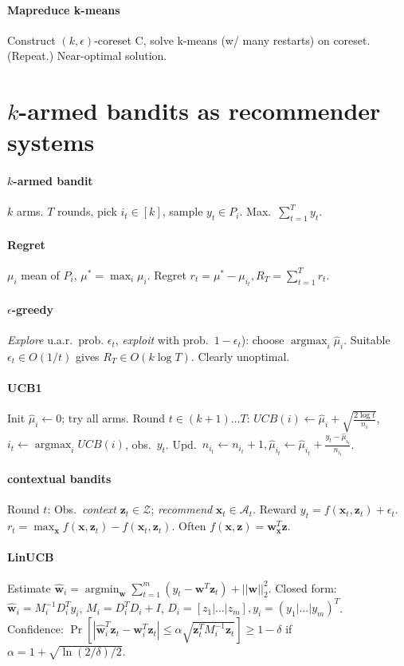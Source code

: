\documentclass[9pt]{scrartcl}
\DeclareMathOperator{\argmin}{argmin}
\DeclareMathOperator{\argmax}{argmax}
\newcommand{\eps}{\epsilon}
\begin{document}
\begin{twocolumn}
\paragraph{Mapreduce k-means} Construct $(k,\eps)$-coreset C, solve k-means (w/ many restarts) on coreset. (Repeat.) Near-optimal solution.

\section{$k$-armed bandits as recommender systems}
\paragraph{$k$-armed bandit}
$k$ arms. $T$ rounds, pick $i_t\in[k]$, sample $y_t \in P_i$. Max.\ $\sum_{t=1}^{T} y_t$.
\paragraph{Regret} $\mu_i$ mean of $P_i$, $\mu^* = \max_i \mu_i$. Regret $r_t = \mu^* - \mu_{i_t}, R_T = \sum_{t=1}^{T} r_t$.
\paragraph{$\eps$-greedy} \emph{Explore} u.a.r.\ prob. $\eps_t$, \emph{exploit} with prob.\ $1-\eps_t$): choose $\argmax_i\hat\mu_i$.
Suitable $\eps_t \in O(1/t)$ gives $R_T \in O(k\log T)$. Clearly unoptimal.
\paragraph{UCB1}
Init $\hat\mu_i \leftarrow 0$; try all arms.
Round $t\in (k+1) \dots T$: $UCB(i) \leftarrow \hat\mu_i+\sqrt{\frac{2\log t}{n_i}}$, $i_t \leftarrow \argmax_i UCB(i)$, obs.\ $y_t$. Upd.\ $n_{i_t} \leftarrow n_{i_t}+1, \hat\mu_{i_t}\leftarrow\hat\mu_{i_t}+\frac{y_t-\hat\mu_{i_t}}{n_{i_t}}$.
\paragraph{contextual bandits} Round $t$: Obs.\ \emph{context} $\bm z_t \in\mathcal Z$; \emph{recommend} $\bm x_t \in \mathcal A_t$. Reward $y_t = f(\bm x_t,\bm z_t) + \eps_t$. $r_t = \max_{\bm x}f(\bm x, \bm z_t) - f(\bm x_t,\bm z_t)$. Often $f(\bm x,\bm z) = \bm w_{\bm x}^T\bm z$.

\paragraph{LinUCB}
Estimate $\hat{\bm w}_{i} = \argmin_{\bm w}\sum_{t=1}^{m}(y_t-\bm w^T\bm z_t) + ||\bm w||_2^2$.
Closed form: $\hat{\bm w}_{i} = M_{i}^{-1}D_{i}^Ty_{i}$,
$M_{i} = D_{i}^TD_{i} + I$,
$D_{i} = [z_1|\dots|z_m], y_{i} = (y_1|\dots|y_m)^T$.\\
Confidence: $\Pr\left [|\hat{\bm w}_{i}^T\bm z_t - \bm w_{i}^T\bm z_t| \leq \alpha\sqrt{\bm z_t^T M_{i}^{-1}\bm z_t}\right ] \geq 1-\delta$ if $\alpha = 1 + \sqrt{\ln(2/\delta)/2}$.


\end{twocolumn}
\end{document}
